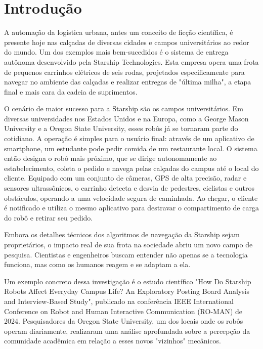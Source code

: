 \chapter[Introdução]{Introdução}

A automação da logística urbana, antes um conceito de ficção científica, é presente hoje nas calçadas de diversas cidades e campos universitários ao redor do mundo. Um dos exemplos mais bem-sucedidos  é o sistema de entrega autônoma desenvolvido pela Starship Technologies. Esta empresa opera uma frota de pequenos carrinhos elétricos de seis rodas, projetados especificamente para navegar no ambiente das calçadas e realizar entregas de "última milha", a etapa final e mais cara da cadeia de suprimentos.

O cenário de maior sucesso para a Starship são os campos universitários. Em diversas universidades nos Estados Unidos e na Europa, como a George Mason University e a Oregon State University, esses robôs já se tornaram parte do cotidiano. A operação é simples para o usuário final: através de um aplicativo de smartphone, um estudante pode pedir comida de um restaurante local. O sistema então designa o robô mais próximo, que se dirige autonomamente ao estabelecimento, coleta o pedido e navega pelas calçadas do campus até o local do cliente. Equipado com um conjunto de câmeras, GPS de alta precisão, radar e sensores ultrassônicos, o carrinho detecta e desvia de pedestres, ciclistas e outros obstáculos, operando a uma velocidade segura de caminhada. Ao chegar, o cliente é notificado e utiliza o mesmo aplicativo para destravar o compartimento de carga do robô e retirar seu pedido. 

 Embora os detalhes técnicos dos algoritmos de navegação da Starship sejam proprietários, o impacto real de sua frota na sociedade abriu um novo campo de pesquisa. Cientistas e engenheiros buscam entender não apenas se a tecnologia funciona, mas como os humanos reagem e se adaptam a ela.

Um exemplo concreto dessa investigação é o estudo científico "How Do Starship Robots Affect Everyday Campus Life? An Exploratory Posting Board Analysis and Interview-Based Study", publicado na conferência IEEE International Conference on Robot and Human Interactive Communication (RO-MAN) de 2024. Pesquisadores da Oregon State University, um dos locais onde os robôs operam diariamente, realizaram uma análise aprofundada sobre a percepção da comunidade acadêmica em relação a esses novos "vizinhos" mecânicos.


